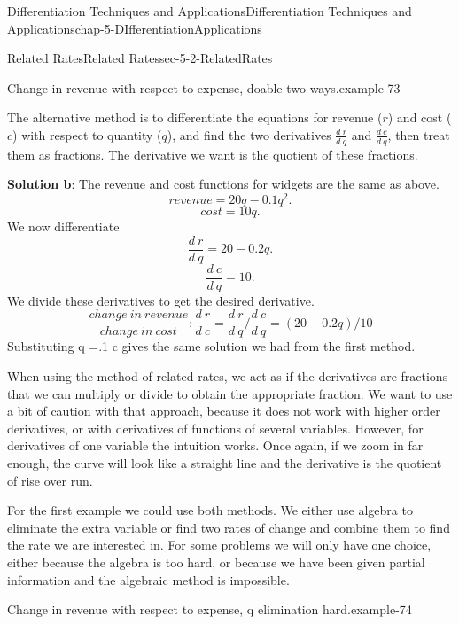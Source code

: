 \documentclass[oneside,10pt,]{book}
\newcommand{\terminology}[1]{\textbf{#1}}
\numberwithin{equation}{section}
\begin{document}
\begin{chapterptx}{Differentiation Techniques and Applications}{}{Differentiation Techniques and Applications}{}{}{chap-5-DIfferentiationApplications}
\begin{sectionptx}{Related Rates}{}{Related Rates}{}{}{sec-5-2-RelatedRates}
\begin{example}{Change in revenue with respect to expense, doable two ways.}{example-73}
\par
\hypertarget{p-1940}{}%
The alternative method is to differentiate the equations for revenue (\(r\)) and cost (\(c\)) with respect to quantity (\(q\)), and find the two derivatives \(\frac{d\ r}{d\ q}\) and \(\frac{d\ c}{d\ q}\), then treat them as fractions.  The derivative we want is the quotient of these fractions.%
\par
\hypertarget{p-1941}{}%
\terminology{Solution b}: The revenue and cost functions for widgets are the same as above.%
%
\begin{equation*}
revenue=20q-0.1 q^2.
\end{equation*}
%
\begin{equation*}
cost=10q.
\end{equation*}
\hypertarget{p-1942}{}%
We now differentiate%
%
\begin{equation*}
\frac{d\ r}{d\ q}  =20-0.2 q.
\end{equation*}
%
\begin{equation*}
\frac{d\ c}{d\ q}=10.
\end{equation*}
\hypertarget{p-1943}{}%
We divide these derivatives to get the desired derivative.%
%
\begin{equation*}
\frac{change\ in\ revenue}{change\ in\ cost}: \frac{d\ r}{d\ c}=\frac{d\ r}{d\ q}/\frac{d\ c}{d\ q}=(20-0.2 q)/10
\end{equation*}
\hypertarget{p-1944}{}%
Substituting q =.1 c gives the same solution we had from the first method.%
\end{example}
\hypertarget{p-1945}{}%
When using the method of related rates, we act as if the derivatives are fractions that we can multiply or divide to obtain the appropriate fraction.  We want to use a bit of caution with that approach, because it does not work with higher order derivatives, or with derivatives of functions of several variables.  However, for derivatives of one variable the intuition works.  Once again, if we zoom in far enough, the curve will look like a straight line and the derivative is the quotient of rise over run.%
\par
\hypertarget{p-1946}{}%
For the first example we could use both methods.  We either use algebra to eliminate the extra variable or find two rates of change and combine them to find the rate we are interested in.  For some problems we will only have one choice, either because the algebra is too hard, or because we have been given partial information and the algebraic method is impossible.%
\begin{example}{Change in revenue with respect to expense, q elimination hard.}{example-74}%

\end{example}
\end{sectionptx}
\end{chapterptx}
\end{document}
